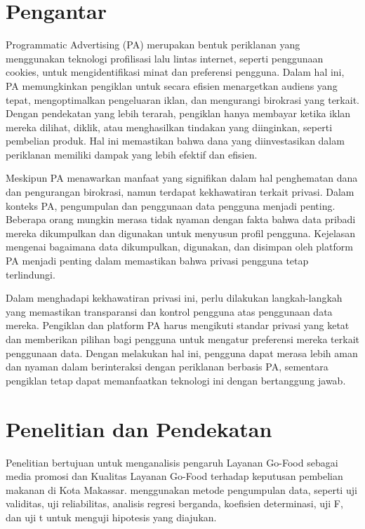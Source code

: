\documentclass{article}
\begin{document}
\section*{Pengantar}

\indent Programmatic Advertising (PA) merupakan bentuk periklanan yang menggunakan teknologi profilisasi lalu lintas internet, seperti penggunaan cookies, untuk mengidentifikasi minat dan preferensi pengguna. Dalam hal ini, PA memungkinkan pengiklan untuk secara efisien menargetkan audiens yang tepat, mengoptimalkan pengeluaran iklan, dan mengurangi birokrasi yang terkait. Dengan pendekatan yang lebih terarah, pengiklan hanya membayar ketika iklan mereka dilihat, diklik, atau menghasilkan tindakan yang diinginkan, seperti pembelian produk. Hal ini memastikan bahwa dana yang diinvestasikan dalam periklanan memiliki dampak yang lebih efektif dan efisien.

Meskipun PA menawarkan manfaat yang signifikan dalam hal penghematan dana dan pengurangan birokrasi, namun terdapat kekhawatiran terkait privasi. Dalam konteks PA, pengumpulan dan penggunaan data pengguna menjadi penting. Beberapa orang mungkin merasa tidak nyaman dengan fakta bahwa data pribadi mereka dikumpulkan dan digunakan untuk menyusun profil pengguna. Kejelasan mengenai bagaimana data dikumpulkan, digunakan, dan disimpan oleh platform PA menjadi penting dalam memastikan bahwa privasi pengguna tetap terlindungi.

Dalam menghadapi kekhawatiran privasi ini, perlu dilakukan langkah-langkah yang memastikan transparansi dan kontrol pengguna atas penggunaan data mereka. Pengiklan dan platform PA harus mengikuti standar privasi yang ketat dan memberikan pilihan bagi pengguna untuk mengatur preferensi mereka terkait penggunaan data. Dengan melakukan hal ini, pengguna dapat merasa lebih aman dan nyaman dalam berinteraksi dengan periklanan berbasis PA, sementara pengiklan tetap dapat memanfaatkan teknologi ini dengan bertanggung jawab.
\section*{Penelitian dan Pendekatan}
Penelitian \cite{mahmud2023analisis} bertujuan untuk menganalisis pengaruh Layanan Go-Food sebagai media promosi dan Kualitas Layanan Go-Food terhadap keputusan pembelian makanan di Kota Makassar. \cite{mahmud2023analisis} menggunakan metode pengumpulan data, seperti uji validitas, uji reliabilitas, analisis regresi berganda, koefisien determinasi, uji F, dan uji t untuk menguji hipotesis yang diajukan.
\end{document}
